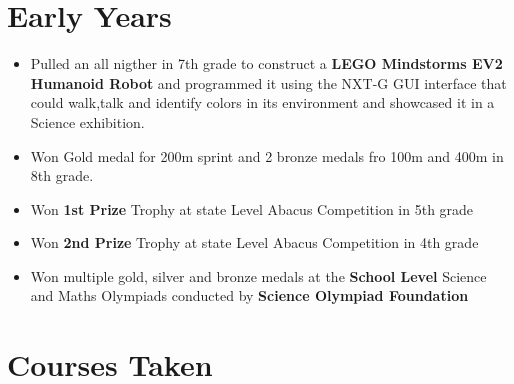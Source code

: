 \documentclass[11pt,a4paper,sans]{moderncv} %
\begin{document}



\section{Early Years}
\begin{itemize}
    \item Pulled an all nigther in 7th grade to construct a \textbf{LEGO Mindstorms EV2 
    Humanoid Robot} and programmed it using the NXT-G GUI interface that could walk,talk 
    and identify colors in its environment and showcased it in a Science exhibition.
    \item Won Gold medal for 200m sprint and 2 bronze medals fro 100m and 400m in 8th grade.
    \item Won \textbf{1st Prize} Trophy at state Level Abacus Competition in 5th grade
    \item Won \textbf{2nd Prize} Trophy at state Level Abacus Competition in 4th grade     
    \item Won multiple gold, silver and bronze medals at the \textbf{School Level}  Science 
    and Maths Olympiads conducted by \textbf{Science Olympiad Foundation}            
\end{itemize}




\section{Courses Taken}
\end{document}
